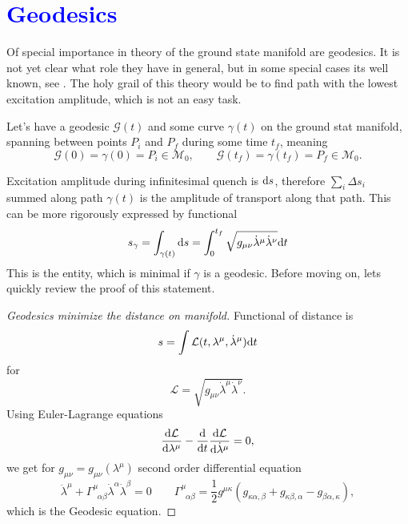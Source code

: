 \chapter{\textcolor{blue}{Geodesics}}
Of special importance in theory of the ground state manifold are geodesics. It is not yet clear what role they have in general, but in some special cases its well known, see \cite{polkovnikov}. The holy grail of this theory would be to find path with the lowest excitation amplitude, which is not an easy task.

Let's have a geodesic $\mathcal{G}(t)$ and some curve $\gamma(t)$ on the ground stat manifold, spanning between points $P_i$ and $P_f$ during some time $t_f$, meaning
 $$\mathcal{G}(0)=\gamma(0)=P_i\in\mathcal{M}_0,\qquad \mathcal{G}(t_f)=\gamma(t_f)=P_f\in\mathcal{M}_0.$$

Excitation amplitude during infinitesimal quench is $\mathrm{d} s$, therefore $\sum_i \Delta s_i$ summed along path $\gamma(t)$ is the amplitude of transport along that path. This can be more rigorously expressed by functional
\begin{equation}
    s_\gamma=\int_{\gamma(t)}\mathrm{d} s=\int_{0}^{t_f}\sqrt{g_{\mu\nu}\dot\lambda^\mu\dot\lambda^\nu}\mathrm{d} t
\end{equation}
This is the entity, which is minimal if $\gamma$ is a geodesic. Before moving on, lets quickly review the proof of this statement.

\begin{proof}[Geodesics minimize the distance on manifold]
    Functional of distance is
    \begin{equation}
        s=\int\mathcal{L}(t,\lambda^\mu,\dot\lambda^\mu)\mathrm{d} t
    \end{equation}
    for 
    \begin{equation}
        \mathcal{L}=\sqrt{g_{\mu\nu}\dot\lambda^\mu\dot\lambda^\nu}.
    \end{equation}
    Using Euler-Lagrange equations 
    \begin{equation}
        \frac{\mathrm{d} \mathcal{L}}{\mathrm{d} \lambda^\mu}-\frac{\mathrm{d} }{\mathrm{d} t}\frac{\mathrm{d} \mathcal{L}}{\mathrm{d} \dot\lambda^\mu}=0,
    \end{equation}
    we get for $g_{\mu\nu}=g_{\mu\nu}(\lambda^\mu)$ second order differential equation
    \begin{equation}
        \ddot\lambda^\mu+\Gamma^\mu_{\;\;\alpha\beta}\dot\lambda^\alpha\dot\lambda^\beta=0\qquad \Gamma^\mu_{\;\;\alpha\beta}=\frac{1}{2}g^{\mu\kappa}\left(g_{\kappa\alpha,\beta}+g_{\kappa\beta,\alpha}-g_{\beta\alpha,\kappa}\right),
        \label{eq:geodesicEquaiton}
    \end{equation}
    which is the Geodesic equation.
\end{proof}

